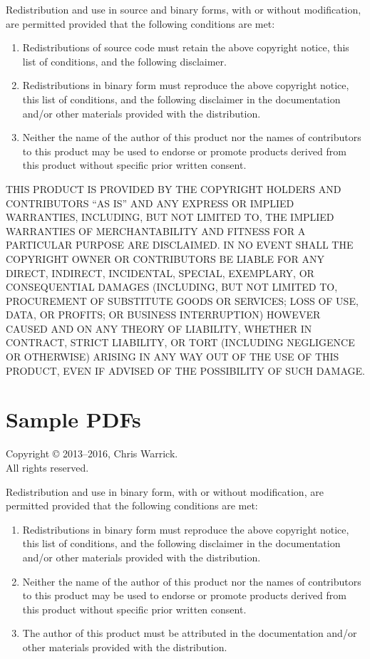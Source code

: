 \documentclass[a4paper,english]{report}
\numberwithin{equation}{section}
\begin{document}
Redistribution and use in source and binary forms, with or without
modification, are permitted provided that the following conditions are
met:

\begin{enumerate}
\item Redistributions of source code must retain the above copyright
   notice, this list of conditions, and the following disclaimer.

\item Redistributions in binary form must reproduce the above copyright
   notice, this list of conditions, and the following disclaimer in the
   documentation and/or other materials provided with the distribution.

\item Neither the name of the author of this product nor the names of
   contributors to this product may be used to endorse or promote
   products derived from this product without specific prior written
   consent.
\end{enumerate}

THIS PRODUCT IS PROVIDED BY THE COPYRIGHT HOLDERS AND CONTRIBUTORS
“AS IS” AND ANY EXPRESS OR IMPLIED WARRANTIES, INCLUDING, BUT NOT
LIMITED TO, THE IMPLIED WARRANTIES OF MERCHANTABILITY AND FITNESS FOR
A PARTICULAR PURPOSE ARE DISCLAIMED.  IN NO EVENT SHALL THE COPYRIGHT
OWNER OR CONTRIBUTORS BE LIABLE FOR ANY DIRECT, INDIRECT, INCIDENTAL,
SPECIAL, EXEMPLARY, OR CONSEQUENTIAL DAMAGES (INCLUDING, BUT NOT
LIMITED TO, PROCUREMENT OF SUBSTITUTE GOODS OR SERVICES; LOSS OF USE,
DATA, OR PROFITS; OR BUSINESS INTERRUPTION) HOWEVER CAUSED AND ON ANY
THEORY OF LIABILITY, WHETHER IN CONTRACT, STRICT LIABILITY, OR TORT
(INCLUDING NEGLIGENCE OR OTHERWISE) ARISING IN ANY WAY OUT OF THE USE
OF THIS PRODUCT, EVEN IF ADVISED OF THE POSSIBILITY OF SUCH DAMAGE.

\pagebreak

\section{Sample PDFs}

Copyright © 2013–2016, Chris Warrick. \\
All rights reserved.

Redistribution and use in binary form, with or without modification,
are permitted provided that the following conditions are met:

\begin{enumerate}
\item Redistributions in binary form must reproduce the above copyright
   notice, this list of conditions, and the following disclaimer in the
   documentation and/or other materials provided with the distribution.
\item Neither the name of the author of this product nor the names of
   contributors to this product may be used to endorse or promote
   products derived from this product without specific prior written
   consent.
\item The author of this product must be attributed in the documentation
   and/or other materials provided with the distribution.
\end{enumerate}
\end{document}
